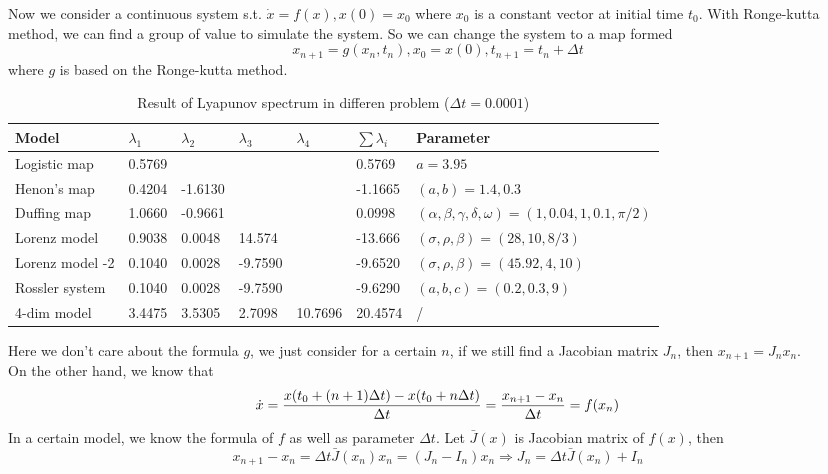 \documentclass[12pt]{article}
\theoremstyle{plain}
\begin{document}
Now we consider a continuous system s.t. $\dot x = f(x), x(0) = x_0$ where $x_0$ is a constant vector at initial time $t_0$. With Ronge-kutta method, we can find a group of value to simulate the system. So we can change the system to a map formed 
$$
x_{n+1} = g(x_n, t_n), x_0 = x(0), t_{n+1} = t_n + \Delta t
$$
where $g$ is based on the Ronge-kutta method. 







\newpage
\begin{table}[H]
\centering  
\caption{Result of Lyapunov spectrum in differen problem ($\Delta t =0.0001$)}  
\begin{tabular}{|l||llll|l||l|}
\hline
Model           & $\lambda_1$ & $\lambda_2$ & $\lambda_3$ & $\lambda_4$ 
                                                        & $\sum\lambda_i$ 
                                                                  & Parameter \\
\hline
\hline
Logistic map    & 0.5769  &         &         &         & 0.5769  & $a = 3.95$ \\
Henon's map     & 0.4204  & -1.6130 &         &         & -1.1665 & $(a, b) = 1.4, 0.3$ \\
Duffing map     & 1.0660  & -0.9661 &         &         & 0.0998  & $(\alpha, \beta, \gamma, \delta, \omega) = (1, 0.04, 1, 0.1, \pi/2)$ \\
Lorenz model    & 0.9038  & 0.0048  & 14.574  &         & -13.666 & $(\sigma, \rho, \beta) = (28, 10, 8/3)$ \\
Lorenz model -2 & 0.1040  & 0.0028  & -9.7590 &         & -9.6520 & $(\sigma, \rho, \beta) = (45.92, 4, 10)$\\
Rossler system  & 0.1040  & 0.0028  & -9.7590 &         & -9.6290 & $(a, b, c) = (0.2, 0.3, 9)$ \\
4-dim model     & 3.4475  & 3.5305  & 2.7098  & 10.7696 & 20.4574 & /\\
\hline
\end{tabular}  
\end{table}












  \noindent Here we don't care about the formula $g$, we just consider for a certain $n$, if we still find a Jacobian matrix $J_n$, then $x_{n+1} = J_n x_n$.
\\\noindent On the other hand, we know that 
$$
\dot x = {x(t_0+(n+1)\Delta t) - x(t_0+n\Delta t) \over \Delta t} = {x_{n+1} - x_n \over \Delta t} = f(x_n)
$$
            In a certain model, we know the formula of $f$ as well as parameter $\Delta t$. Let $\bar J(x)$ is Jacobian matrix of $f(x)$, then
$$
x_{n+1} - x_n = \Delta t \bar J(x_n)x_n = (J_n - I_n) x_n \Rightarrow J_n = \Delta t\bar J(x_n) + I_n
$$
\end{document}
